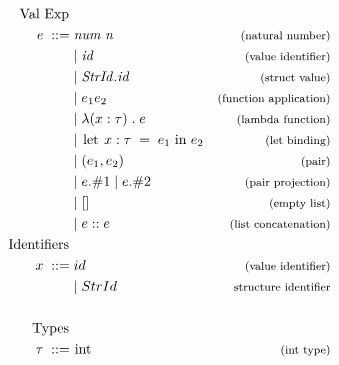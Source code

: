 \begin{figure}[htb]
\begin{align*}
\begin{aligned}
\text{Val Exp } \\
e \; ::= \; &\mathit{num \; n \;}     &\expl{(natural number)} \\
&|\;\mathit{id}                       &\expl{(value identifier)}\\
&|\;\mathit{StrId.id}                 &\expl{(struct value)}\\
&|\;e_{1}e_{2}                        & \expl{(function application)}\\
&|\;\lambda(x:\tau)\;.\;e             &\expl{(lambda function)}\\
&|\;\text{\lsttext{let}}\; x : \tau \; =\; e_{1}\; \text{\lsttext{in}} \; e_{2}
                                      &\expl{(let binding)}\\
&|\;(e_{1}, e_{2})                    &\expl{(pair)}\\
&|\;e.\#1 \;| \;e.\#2                 &\expl{(pair projection)}\\
&|\;[]                                &\expl{(empty list)}\\
&|\;e::e                              &\expl{(list concatenation)}
\\
\text{Identifiers } \\
x \; ::= \; &id                      & \expl{(value identifier)}\\ 
&|\;StrId                            & \expl{structure identifier}\\
\\
\text{Types }\\
\tau \; ::= \; &\text{\lsttext{int}} &\expl{(int type)}\\

\end{aligned}
\end{align*}
\end{figure}
